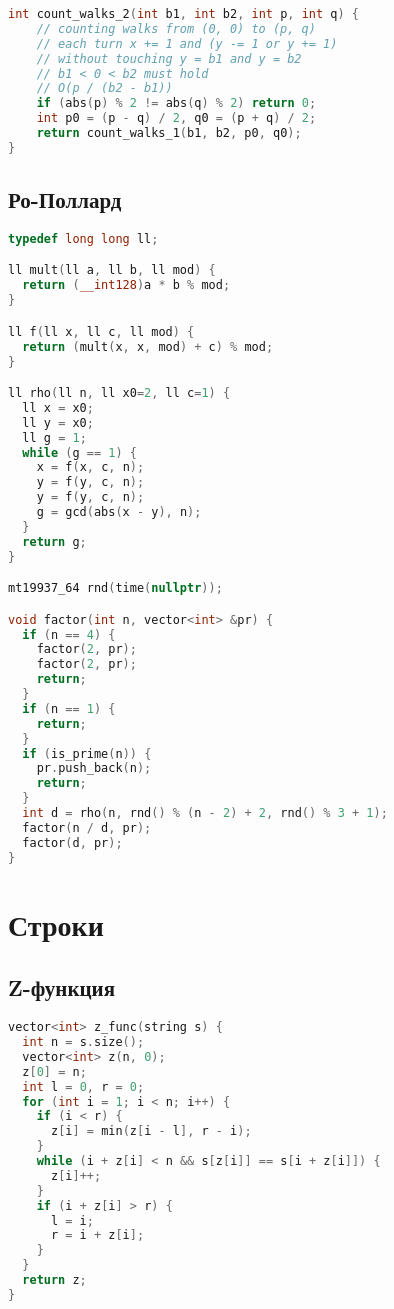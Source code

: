 \documentclass[9pt,a4paper,landscape,twosided]{extarticle}
\begin{document}
\begin{multicols*}{3}
\begin{lstlisting}[language=C++]
int count_walks_2(int b1, int b2, int p, int q) {
    // counting walks from (0, 0) to (p, q)
    // each turn x += 1 and (y -= 1 or y += 1)
    // without touching y = b1 and y = b2
    // b1 < 0 < b2 must hold
    // O(p / (b2 - b1))
    if (abs(p) % 2 != abs(q) % 2) return 0;
    int p0 = (p - q) / 2, q0 = (p + q) / 2;
    return count_walks_1(b1, b2, p0, q0);
}
\end{lstlisting}

\subsection{Ро-Поллард}
\begin{lstlisting}[language=C++]
typedef long long ll;

ll mult(ll a, ll b, ll mod) {
  return (__int128)a * b % mod;
}

ll f(ll x, ll c, ll mod) {
  return (mult(x, x, mod) + c) % mod;
}

ll rho(ll n, ll x0=2, ll c=1) {
  ll x = x0;
  ll y = x0;
  ll g = 1;
  while (g == 1) {
    x = f(x, c, n);
    y = f(y, c, n);
    y = f(y, c, n);
    g = gcd(abs(x - y), n);
  }
  return g;
}

mt19937_64 rnd(time(nullptr));

void factor(int n, vector<int> &pr) {
  if (n == 4) {
    factor(2, pr);
    factor(2, pr);
    return;
  }
  if (n == 1) {
    return;
  }
  if (is_prime(n)) {
    pr.push_back(n);
    return;
  }
  int d = rho(n, rnd() % (n - 2) + 2, rnd() % 3 + 1);
  factor(n / d, pr);
  factor(d, pr);
}
\end{lstlisting}

\section{Строки}

\subsection{Z-функция}
\begin{lstlisting}[language=C++]
vector<int> z_func(string s) {
  int n = s.size();
  vector<int> z(n, 0);
  z[0] = n;
  int l = 0, r = 0;
  for (int i = 1; i < n; i++) {
    if (i < r) {
      z[i] = min(z[i - l], r - i);
    }
    while (i + z[i] < n && s[z[i]] == s[i + z[i]]) {
      z[i]++;
    }
    if (i + z[i] > r) {
      l = i;
      r = i + z[i];
    }
  }
  return z;
}
\end{lstlisting}


\end{multicols*}
\end{document}
